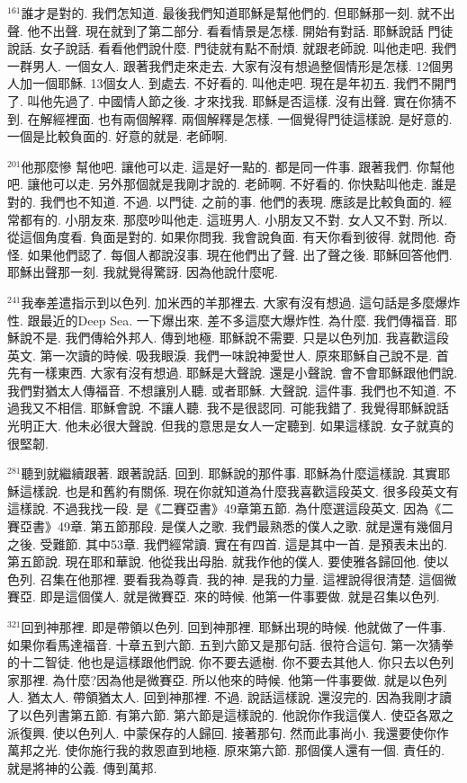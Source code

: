 \documentclass{book}
\begin{document}
$^{161}$誰才是對的.
我們怎知道.
最後我們知道耶穌是幫他們的.
但耶穌那一刻.
就不出聲.
他不出聲.
現在就到了第二部分.
看看情景是怎樣.
開始有對話.
耶穌說話 門徒說話.
女子說話.
看看他們說什麼.
門徒就有點不耐煩.
就跟老師說.
叫他走吧.
我們一群男人.
一個女人.
跟著我們走來走去.
大家有沒有想過整個情形是怎樣.
12個男人加一個耶穌.
13個女人.
到處去.
不好看的.
叫他走吧.
現在是年初五.
我們不開門了.
叫他先過了.
中國情人節之後.
才來找我.
耶穌是否這樣.
沒有出聲.
實在你猜不到.
在解經裡面.
也有兩個解釋.
兩個解釋是怎樣.
一個覺得門徒這樣說.
是好意的.
一個是比較負面的.
好意的就是.
老師啊.

$^{201}$他那麼慘 幫他吧.
讓他可以走.
這是好一點的.
都是同一件事.
跟著我們.
你幫他吧.
讓他可以走.
另外那個就是我剛才說的.
老師啊.
不好看的.
你快點叫他走.
誰是對的.
我們也不知道.
不過.
以門徒.
之前的事.
他們的表現.
應該是比較負面的.
經常都有的.
小朋友來.
那麼吵叫他走.
這班男人.
小朋友又不對.
女人又不對.
所以.
從這個角度看.
負面是對的.
如果你問我.
我會說負面.
有天你看到彼得.
就問他.
奇怪.
如果他們認了.
每個人都說沒事.
現在他們出了聲.
出了聲之後.
耶穌回答他們.
耶穌出聲那一刻.
我就覺得驚訝.
因為他說什麼呢.

$^{241}$我奉差遣指示到以色列.
加米西的羊那裡去.
大家有沒有想過.
這句話是多麼爆炸性.
跟最近的Deep Sea.
一下爆出來.
差不多這麼大爆炸性.
為什麼.
我們傳福音.
耶穌說不是.
我們傳給外邦人.
傳到地極.
耶穌說不需要.
只是以色列加.
我喜歡這段英文.
第一次讀的時候.
吸我眼淚.
我們一味說神愛世人.
原來耶穌自己說不是.
首先有一樣東西.
大家有沒有想過.
耶穌是大聲說.
還是小聲說.
會不會耶穌跟他們說.
我們對猶太人傳福音.
不想讓別人聽.
或者耶穌.
大聲說.
這件事.
我們也不知道.
不過我又不相信.
耶穌會說.
不讓人聽.
我不是很認同.
可能我錯了.
我覺得耶穌說話光明正大.
他未必很大聲說.
但我的意思是女人一定聽到.
如果這樣說.
女子就真的很堅韌.

$^{281}$聽到就繼續跟著.
跟著說話.
回到.
耶穌說的那件事.
耶穌為什麼這樣說.
其實耶穌這樣說.
也是和舊約有關係.
現在你就知道為什麼我喜歡這段英文.
很多段英文有這樣說.
不過我找一段.
是《二賽亞書》49章第五節.
為什麼選這段英文.
因為《二賽亞書》49章.
第五節那段.
是僕人之歌.
我們最熟悉的僕人之歌.
就是還有幾個月之後.
受難節.
其中53章.
我們經常讀.
實在有四首.
這是其中一首.
是預表未出的.
第五節說.
現在耶和華說.
他從我出母胎.
就我作他的僕人.
要使雅各歸回他.
使以色列.
召集在他那裡.
要看我為尊貴.
我的神.
是我的力量.
這裡說得很清楚.
這個微賽亞.
即是這個僕人.
就是微賽亞.
來的時候.
他第一件事要做.
就是召集以色列.

$^{321}$回到神那裡.
即是帶領以色列.
回到神那裡.
耶穌出現的時候.
他就做了一件事.
如果你看馬達福音.
十章五到六節.
五到六節又是那句話.
很符合這句.
第一次猜拳的十二智徒.
他也是這樣跟他們說.
你不要去遞樹.
你不要去其他人.
你只去以色列家那裡.
為什麼?因為他是微賽亞.
所以他來的時候.
他第一件事要做.
就是以色列人.
猶太人.
帶領猶太人.
回到神那裡.
不過.
說話這樣說.
還沒完的.
因為我剛才讀了以色列書第五節.
有第六節.
第六節是這樣說的.
他說你作我這僕人.
使亞各眾之派復興.
使以色列人.
中蒙保存的人歸回.
接著那句.
然而此事尚小.
我還要使你作萬邦之光.
使你施行我的救恩直到地極.
原來第六節.
那個僕人還有一個.
責任的.
就是將神的公義.
傳到萬邦.
\end{document}
